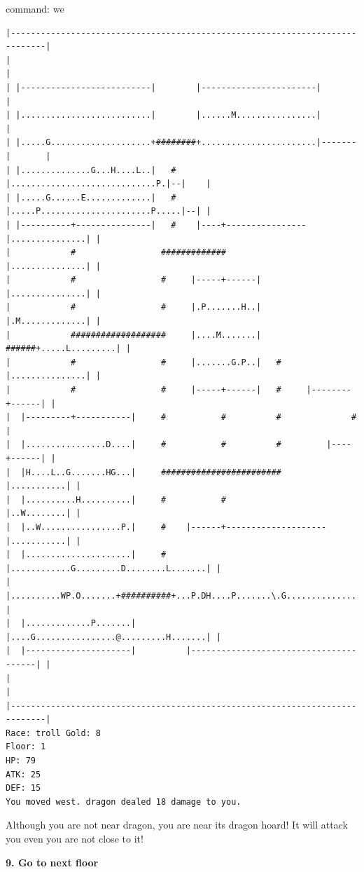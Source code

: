 \documentclass[11pt]{article}
\theoremstyle{plain}
\begin{document}
command: we
\begin{Verbatim}[fontsize=\scriptsize]
|-----------------------------------------------------------------------------|
|                                                                             |
| |--------------------------|        |-----------------------|               |
| |..........................|        |......M................|               |
| |.....G....................+########+.......................|-------|       |
| |..............G...H....L..|   #    |.............................P.|--|    |
| |.....G......E.............|   #    |.....P......................P.....|--| |
| |----------+---------------|   #    |----+----------------|...............| |
|            #                 #############                |...............| |
|            #                 #     |-----+------|         |...............| |
|            #                 #     |.P.......H..|         |.M.............| |
|            ###################     |....M.......|   ######+.....L.........| |
|            #                 #     |.......G.P..|   #     |...............| |
|            #                 #     |-----+------|   #     |--------+------| |
|  |---------+-----------|     #           #          #              #        |
|  |................D....|     #           #          #         |----+------| |
|  |H....L..G.......HG...|     ########################         |...........| |
|  |..........H..........|     #           #                    |..W........| |
|  |..W................P.|     #    |------+--------------------|...........| |
|  |.....................|     #    |............G.........D........L.......| |
|  |..........WP.O.......+##########+...P.DH....P.......\.G.................| |
|  |.............P.......|          |....G................@.........H.......| |
|  |---------------------|          |---------------------------------------| |
|                                                                             |
|-----------------------------------------------------------------------------|
Race: troll Gold: 8                                                    Floor: 1
HP: 79
ATK: 25
DEF: 15
You moved west. dragon dealed 18 damage to you. 
\end{Verbatim}

Although you are not near dragon, you are near its dragon hoard! It will 
attack you even you are not close to it!


\newpage
\textbf{9. Go to next floor}
\end{document}
